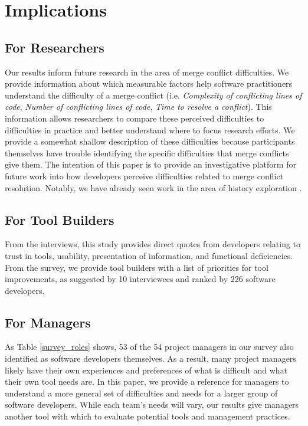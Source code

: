 \section{Implications}\label{implications}
\subsection{For Researchers}
Our results inform future research in the area of merge conflict difficulties.
We provide information about which measurable factors help software practitioners understand the difficulty of a merge conflict (i.e. \textit{Complexity of conflicting lines of code}, \textit{Number of conflicting lines of code}, \textit{Time to resolve a conflict}). This information allows researchers to compare these perceived difficulties to difficulties in practice and better understand where to focus research efforts. We provide a somewhat shallow description of these difficulties because participants themselves have trouble identifying the specific difficulties that merge conflicts give them. 
The intention of this paper is to provide an investigative platform for future work into how developers perceive difficulties related to merge conflict resolution. Notably, we have already seen work in the area of history exploration \cite{mihai_lenses}.
\subsection{For Tool Builders}
From the interviews, this study provides direct quotes from developers relating to trust in tools, usability, presentation of information, and functional deficiencies. From the survey, we provide tool builders with a list of priorities for tool improvements, as suggested by 10 interviewees and ranked by 226 software developers. 
\subsection{For Managers}
As Table \ref{survey_roles} shows, 53 of the 54 project managers in our survey also identified as software developers themselves. As a result, many project managers likely have their own experiences and preferences of what is difficult and what their own tool needs are. In this paper, we provide a reference for managers to understand a more general set of difficulties and needs for a larger group of software developers. While each team's needs will vary, our results give managers another tool with which to evaluate potential tools and management practices.